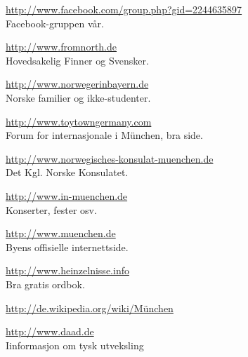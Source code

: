 \url{http://www.facebook.com/group.php?gid=2244635897} \\
Facebook-gruppen vår.

\url{http://www.fromnorth.de} \\
Hovedsakelig Finner og Svensker.

\url{http://www.norwegerinbayern.de} \\
Norske familier og ikke-studenter.

\url{http://www.toytowngermany.com} \\
Forum for internasjonale i München, bra side.

\url{http://www.norwegisches-konsulat-muenchen.de} \\
Det Kgl. Norske Konsulatet.

\url{http://www.in-muenchen.de} \\
Konserter, fester osv.

\url{http://www.muenchen.de} \\
Byens offisielle internettside.

\url{http://www.heinzelnisse.info} \\
Bra gratis ordbok.

\url{http://de.wikipedia.org/wiki/München}

\url{http://www.daad.de} \\
Iinformasjon om tysk utveksling





 
 	